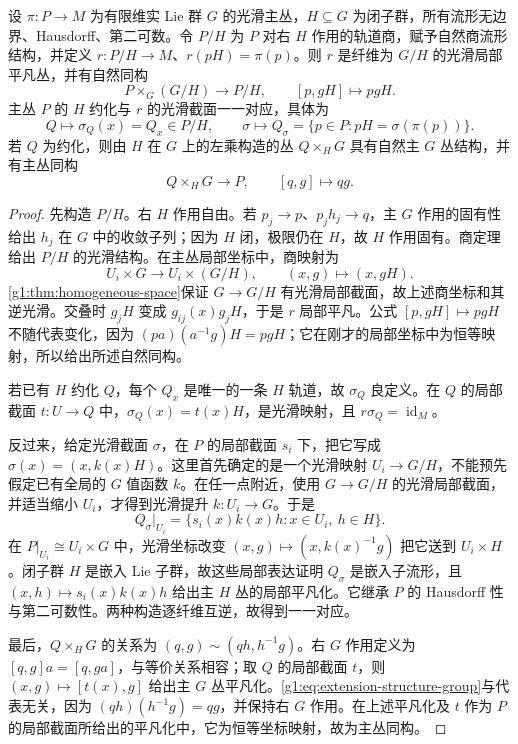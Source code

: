 \begin{theorem}\label{g1:thm:reduction-section-criterion}
	设 \(\pi:P\to M\) 为有限维实 Lie 群 \(G\) 的光滑主丛，\(H\subseteq G\) 为闭子群，所有流形无边界、Hausdorff、第二可数。令 \(P/H\) 为 \(P\) 对右 \(H\) 作用的轨道商，赋予自然商流形结构，并定义 \(r:P/H\to M\)、\(r(pH)=\pi(p)\)。则 \(r\) 是纤维为 \(G/H\) 的光滑局部平凡丛，并有自然同构
	\[
		P\times_G(G/H)\longrightarrow P/H,\qquad
		[p,gH]\longmapsto pgH.
	\]
	主丛 \(P\) 的 \(H\) 约化与 \(r\) 的光滑截面一一对应，具体为
	\[
		Q\longmapsto\sigma_Q(x)=Q_x\in P/H,
		\qquad
		\sigma\longmapsto Q_\sigma=\{p\in P:pH=\sigma(\pi(p))\}.
	\]
	若 \(Q\) 为约化，则由 \(H\) 在 \(G\) 上的左乘构造的丛 \(Q\times_HG\) 具有自然主 \(G\) 丛结构，并有主丛同构
	\begin{equation}\label{g1:eq:extension-structure-group}
		Q\times_HG\longrightarrow P,\qquad[q,g]\longmapsto qg.
	\end{equation}
\end{theorem}
\begin{proof}
	先构造 \(P/H\)。右 \(H\) 作用自由。若 \(p_j\to p\)、\(p_jh_j\to q\)，主 \(G\) 作用的固有性给出 \(h_j\) 在 \(G\) 中的收敛子列；因为 \(H\) 闭，极限仍在 \(H\)，故 \(H\) 作用固有。商定理给出 \(P/H\) 的光滑结构。在主丛局部坐标中，商映射为
	\[
		U_i\times G\longrightarrow U_i\times(G/H),\qquad
		(x,g)\longmapsto(x,gH).
	\]
	\cref{g1:thm:homogeneous-space}保证 \(G\to G/H\) 有光滑局部截面，故上述商坐标和其逆光滑。交叠时 \(g_jH\) 变成 \(g_{ij}(x)g_jH\)，于是 \(r\) 局部平凡。公式 \([p,gH]\mapsto pgH\) 不随代表变化，因为 \((pa)(a^{-1}g)H=pgH\)；它在刚才的局部坐标中为恒等映射，所以给出所述自然同构。

	若已有 \(H\) 约化 \(Q\)，每个 \(Q_x\) 是唯一的一条 \(H\) 轨道，故 \(\sigma_Q\) 良定义。在 \(Q\) 的局部截面 \(t:U\to Q\) 中，\(\sigma_Q(x)=t(x)H\)，是光滑映射，且 \(r\sigma_Q=\operatorname{id}_M\)。

	反过来，给定光滑截面 \(\sigma\)，在 \(P\) 的局部截面 \(s_i\) 下，把它写成 \(\sigma(x)=(x,k(x)H)\)。这里首先确定的是一个光滑映射 \(U_i\to G/H\)，不能预先假定已有全局的 \(G\) 值函数 \(k\)。在任一点附近，使用 \(G\to G/H\) 的光滑局部截面，并适当缩小 \(U_i\)，才得到光滑提升 \(k:U_i\to G\)。于是
	\[
		Q_\sigma|_{U_i}=\{s_i(x)k(x)h:x\in U_i,\ h\in H\}.
	\]
	在 \(P|_{U_i}\cong U_i\times G\) 中，光滑坐标改变 \((x,g)\mapsto(x,k(x)^{-1}g)\) 把它送到 \(U_i\times H\)。闭子群 \(H\) 是嵌入 Lie 子群，故这些局部表达证明 \(Q_\sigma\) 是嵌入子流形，且 \((x,h)\mapsto s_i(x)k(x)h\) 给出主 \(H\) 丛的局部平凡化。它继承 \(P\) 的 Hausdorff 性与第二可数性。两种构造逐纤维互逆，故得到一一对应。

	最后，\(Q\times_HG\) 的关系为 \((q,g)\sim(qh,h^{-1}g)\)。右 \(G\) 作用定义为 \([q,g]a=[q,ga]\)，与等价关系相容；取 \(Q\) 的局部截面 \(t\)，则 \((x,g)\mapsto[t(x),g]\) 给出主 \(G\) 丛平凡化。\eqref{g1:eq:extension-structure-group}与代表无关，因为 \((qh)(h^{-1}g)=qg\)，并保持右 \(G\) 作用。在上述平凡化及 \(t\) 作为 \(P\) 的局部截面所给出的平凡化中，它为恒等坐标映射，故为主丛同构。
\end{proof}

